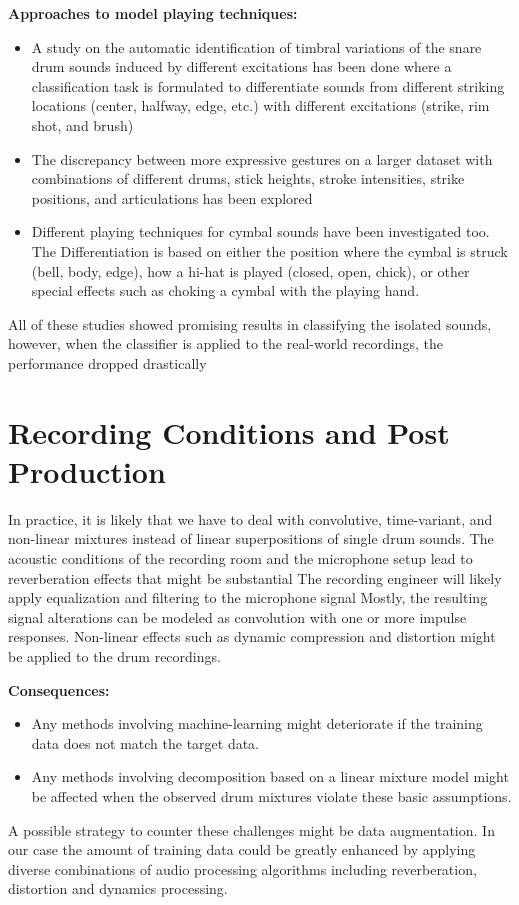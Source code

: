 \textbf{Approaches to model playing techniques:}
\begin{itemize}
\item A study on the automatic identification of timbral variations of the snare drum sounds induced by different excitations has been done where a classification task is formulated to differentiate sounds from different striking locations (center, halfway, edge, etc.) with different excitations (strike, rim shot, and brush)
\item The discrepancy between more expressive gestures on a larger dataset with combinations of different drums, stick heights, stroke intensities, strike positions, and articulations has been explored
\item Different playing techniques for cymbal sounds have been investigated too. The Differentiation is based on either the position where the cymbal is struck (bell, body, edge), how a hi-hat is played (closed, open, chick), or other special effects such as choking a cymbal with the playing hand.
\end{itemize}

All of these studies showed promising results in classifying the isolated sounds, however, when the classifier is applied to the real-world recordings, the performance dropped drastically



\section{Recording Conditions and Post Production}
In practice, it is likely that we have to deal with convolutive, time-variant, and non-linear mixtures instead of linear superpositions of single drum sounds. The acoustic conditions of the recording room and the microphone setup lead to reverberation effects that might be substantial
The recording engineer will likely apply equalization and filtering to the microphone signal
Mostly, the resulting signal alterations can be modeled as convolution with one or more impulse responses.
Non-linear effects such as dynamic compression and distortion might be applied to the drum recordings.

\textbf{Consequences:}
\begin{itemize}
\item Any methods involving machine-learning might deteriorate if the training data does not match the target data.
\item Any methods involving decomposition based on a linear mixture model might be affected when the observed drum mixtures violate these basic assumptions. 
\end{itemize}
A possible strategy to counter these challenges might be data augmentation. In our case the amount of training data could be greatly enhanced by applying diverse combinations of audio processing algorithms including reverberation, distortion and dynamics processing.



